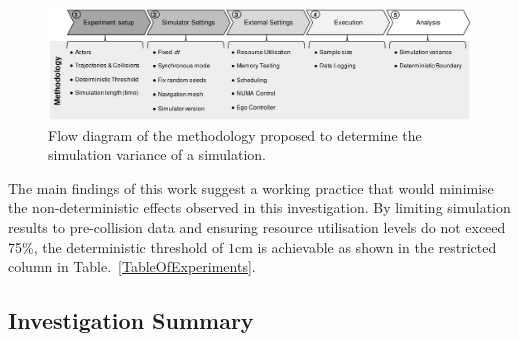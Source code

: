 \documentclass[letterpaper, 10 pt, journal, twoside]{IEEEtran}
\begin{document}
%
\begin{figure}[b]
    \centering
    \includegraphics[width=0.99\linewidth]{Other/Figures/Methodology_Diagram_v3.pdf}
    \caption{Flow diagram of the methodology proposed to determine the simulation variance of a simulation.}
    \label{method_diagram}
\end{figure}

 
The main findings of this work suggest a working practice that would minimise the non-deterministic effects observed in this investigation. By limiting simulation results to pre-collision data and ensuring resource utilisation levels do not exceed 75\%, the deterministic threshold of $1$cm is achievable as shown in the restricted column in Table.~\ref{TableOfExperiments}.

\subsection{Investigation Summary} \label{s:empirical_summary}
\end{document}
